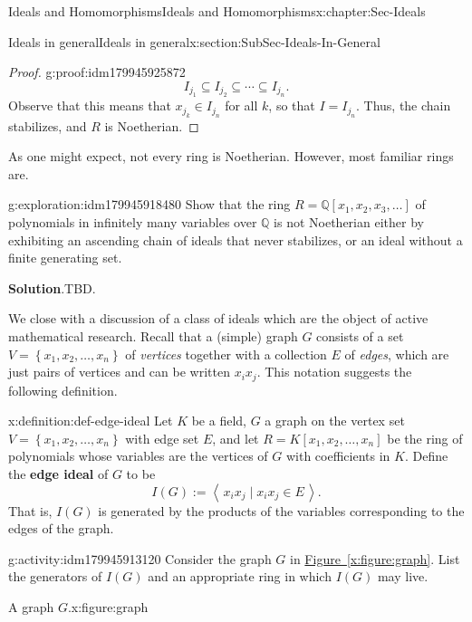 \documentclass[oneside,10pt,]{book}
\newcommand{\blocktitlefont}{\relax}
\newcommand{\xreffont}{\relax}
\newcommand{\terminology}[1]{\textbf{#1}}
\numberwithin{equation}{section}
\newcommand{\ideal}[1]{\left\langle\, #1 \,\right\rangle}
\newcommand{\set}[1]{\left\{ {#1} \right\}}
\def\Q{{\mathbb Q}}
\begin{document}
\begin{chapterptx}{Ideals and Homomorphisms}{}{Ideals and Homomorphisms}{}{}{x:chapter:Sec-Ideals}
\begin{sectionptx}{Ideals in general}{}{Ideals in general}{}{}{x:section:SubSec-Ideals-In-General}
\begin{proof}{}{g:proof:idm179945925872}
\begin{equation*}
I_{j_1} \subseteq I_{j_2}\subseteq \cdots \subseteq I_{j_n}.
\end{equation*}
Observe that this means that \(x_{j_k}\in I_{j_n}\) for all \(k\), so that \(I = I_{j_n}\). Thus, the chain stabilizes, and \(R\) is Noetherian.%
\end{proof}
As one might expect, not every ring is Noetherian. However, most familiar rings are.%
\begin{exploration}{}{g:exploration:idm179945918480}%
Show that the ring \(R = \Q[x_1, x_2, x_3, \ldots]\) of polynomials in infinitely many variables over \(\Q\) is not Noetherian either by exhibiting an ascending chain of ideals that never stabilizes, or an ideal without a finite generating set.%
\par\smallskip%
\noindent\textbf{\blocktitlefont Solution}.\hypertarget{g:solution:idm179945916896}{}\quad{}TBD.%
\end{exploration}
We close with a discussion of a class of ideals which are the object of active mathematical research. Recall that a (simple) graph \(G\) consists of a set \(V = \set{x_1, x_2, \ldots, x_n}\) of \emph{vertices} together with a collection \(E\) of \emph{edges}, which are just pairs of vertices and can be written \(x_i x_j\). This notation suggests the following definition.%
\begin{definition}{}{x:definition:def-edge-ideal}%
Let \(K\) be a field, \(G\) a graph on the vertex set \(V = \set{x_1, x_2, \ldots, x_n}\) with edge set \(E\), and let \(R = K[x_1, x_2, \ldots, x_n]\) be the ring of polynomials whose variables are the vertices of \(G\) with coefficients in \(K\). Define the \terminology{edge ideal} of \(G\) to be%
\begin{equation*}
I(G) := \ideal{x_i x_j \mid x_i x_j\in E}.
\end{equation*}
That is, \(I(G)\) is generated by the products of the variables corresponding to the edges of the graph.%
\end{definition}
\begin{activity}{}{g:activity:idm179945913120}%
Consider the graph \(G\) in \hyperref[x:figure:graph]{Figure~{\xreffont\ref{x:figure:graph}}}. List the generators of \(I(G)\) and an appropriate ring in which \(I(G)\) may live.%
\end{activity}
\begin{figureptx}{A graph \(G\).}{x:figure:graph}{}%
\begin{image}{0.25}{0.5}{0.25}%

\end{image}
\end{figureptx}
\end{sectionptx}
\end{chapterptx}
\end{document}
